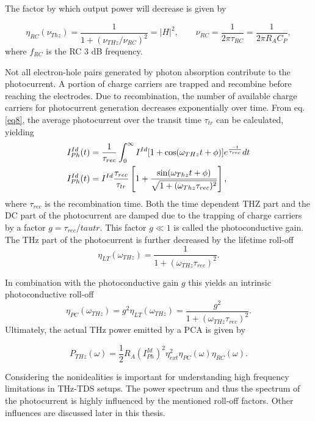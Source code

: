 The factor by which output power will decrease is given by 

\begin{equation}
    \eta_{RC}(\nu_{Thz}) = \frac{1}{1+ (\nu_{THz}/\nu_{RC})^2} = |H|^2,  \qquad  \nu_{RC} = \frac{1}{2\pi\tau_{RC}} = \frac{1}{2\pi R_A C_P},
\end{equation}
where $f_{RC}$ is the RC 3 dB frequency.

Not all electron-hole pairs generated by photon absorption contribute to the photocurrent. A portion of charge carriers are trapped and recombine before reaching the electrodes. Due to recombination, the number of available charge carriers for photocurrent generation decreases exponentially over time. From eq. \eqref{eq8}, the average photocurrent over the transit time $\tau_{tr}$ can be calculated, yielding
\begin{align}
	I_{Ph}^{Id}(t) &= \frac{1}{\tau_{rec}} \int_{0}^{\infty} I^{Id}[1 + \cos(\omega_{THz}t + \phi)]e^{\frac{-t}{\tau_{rec}}}dt \notag \\
	I_{Ph}^{Id}(t) &=  I^{Id}\frac{\tau_{rec}}{\tau_{tr}}\left[
		1 + \frac{\sin(\omega_{Thz}t + \phi)}{\sqrt{1 + (\omega_{Thz} \tau_{rec})^2}}
	\right],
\end{align}
where $\tau_{rec}$ is the recombination time. Both the time dependent THZ part and the DC part of the photocurrent are damped due to the trapping of charge carriers by a factor $g = \tau_{rec} /tau{tr}$. This factor $g \ll 1$ is called the photoconductive gain. The THz part of the photocurrent is further decreased by the lifetime roll-off 
\begin{equation}
	\eta_{LT}(\omega_{THz}) = \frac{1}{1 + (\omega_{THz}\tau_{rec})^2}.
\end{equation}

In combination with the photoconductive gain $g$ this yields an intrinsic photoconductive roll-off
\begin{equation}
	\eta_{PC}(\omega_{THz}) = g^2\eta_{LT}(\omega_{THz}) = \frac{g^2}{1 + (\omega_{THz}\tau_{rec})^2}.
\end{equation}
Ultimately, the actual THz power emitted by a PCA is given by 

\begin{equation}
    P_{THz}(\omega) = \frac{1}{2}R_A(I_{Ph}^{Id})^2\eta_{ext}^2\eta_{PC}(\omega)\eta_{RC}(\omega).
    \label{eq_power}
\end{equation}

Considering the nonidealities is important for understanding high frequency limitations in THz-TDS setups. The power spectrum and thus the spectrum of the photocurrent is highly influenced by the mentioned roll-off factors. Other influences are discussed later in this thesis. 

